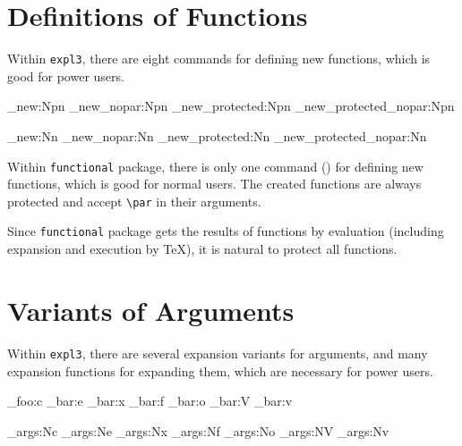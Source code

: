 \documentclass[oneside]{book}
\begin{document}
\section{Definitions of Functions}

Within \verb!expl3!, there are eight commands for defining new functions,
which is good for power users.

\begin{minipage}{0.5\textwidth}
\begin{code}[language=latex/latex3]
\cs_new:Npn
\cs_new_nopar:Npn
\cs_new_protected:Npn
\cs_new_protected_nopar:Npn
\end{code}
\end{minipage}%
\begin{minipage}{0.5\textwidth}
\begin{code}[language=latex/latex3]
\cs_new:Nn
\cs_new_nopar:Nn
\cs_new_protected:Nn
\cs_new_protected_nopar:Nn
\end{code}
\end{minipage}

Within \verb!functional! package, there is only one command ()
for defining new functions, which is good for normal users.
The created functions are always protected and accept \verb!\par! in their arguments.

Since \verb!functional! package gets the results of functions by evaluation
(including expansion and execution by \TeX), it is natural to protect all functions.

\section{Variants of Arguments}

Within \verb!expl3!, there are several expansion variants for arguments,
and many expansion functions for expanding them, which are necessary for power users.

\begin{minipage}{0.5\textwidth}
\begin{code}[language=latex/latex3]
\module_foo:c
\module_bar:e
\module_bar:x
\module_bar:f
\module_bar:o
\module_bar:V
\module_bar:v
\end{code}
\end{minipage}%
\begin{minipage}{0.5\textwidth}
\begin{code}[language=latex/latex3]
\exp_args:Nc
\exp_args:Ne
\exp_args:Nx
\exp_args:Nf
\exp_args:No
\exp_args:NV
\exp_args:Nv
\end{code}
\end{minipage}
\end{document}
